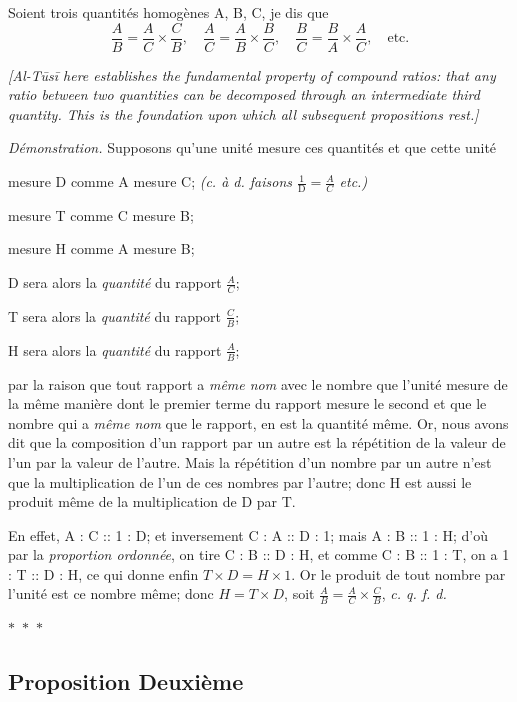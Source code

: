 \documentclass[11pt,a4paper]{article}
\theoremstyle{plain}
\theoremstyle{definition}
\theoremstyle{remark}
\newcommand{\ornament}{\begin{center}\textcolor{goldaccent}{$\ast$~$\ast$~$\ast$}\end{center}}
\begin{document}
Soient trois quantités homogènes A, B, C, je dis que
\[
\frac{A}{B} = \frac{A}{C} \times \frac{C}{B}, \quad
\frac{A}{C} = \frac{A}{B} \times \frac{B}{C}, \quad
\frac{B}{C} = \frac{B}{A} \times \frac{A}{C}, \quad \text{etc.}
\]


\noindent\textit{[Al-Tūsī here establishes the fundamental property of compound ratios: that any ratio between two quantities can be decomposed through an intermediate third quantity. This is the foundation upon which all subsequent propositions rest.]}


\textit{Démonstration.} Supposons qu'une unité mesure ces quantités et que cette unité

mesure D comme A mesure C; \textit{(c. à d. faisons $\frac{1}{\mathrm{D}} = \frac{A}{C}$ etc.)}

mesure T comme C mesure B;

mesure H comme A mesure B;

D sera alors la \textit{quantité} du rapport $\frac{A}{C}$;

T sera alors la \textit{quantité} du rapport $\frac{C}{B}$;

H sera alors la \textit{quantité} du rapport $\frac{A}{B}$;

par la raison que tout rapport a \textit{même nom} avec le nombre que l'unité mesure de la même manière dont le premier terme du rapport mesure le second et que le nombre qui a \textit{même nom} que le rapport, en est la quantité même. Or, nous avons dit que la composition d'un rapport par un autre est la répétition de la valeur de l'un par la valeur de l'autre. Mais la répétition d'un nombre par un autre n'est que la multiplication de l'un de ces nombres par l'autre; donc H est aussi le produit même de la multiplication de D par T.

En effet, A : C :: 1 : D; et inversement C : A :: D : 1; mais A : B :: 1 : H; d'où par la \textit{proportion ordonnée}, on tire C : B :: D : H, et comme C : B :: 1 : T, on a 1 : T :: D : H, ce qui donne enfin $T \times D = H \times 1$. Or le produit de tout nombre par l'unité est ce nombre même; donc $H = T \times D$, soit $\frac{A}{B} = \frac{A}{C} \times \frac{C}{B}$, \textit{c. q. f. d.}


\ornament

\subsection{Proposition Deuxième}
\label{prop:2}
\end{document}
